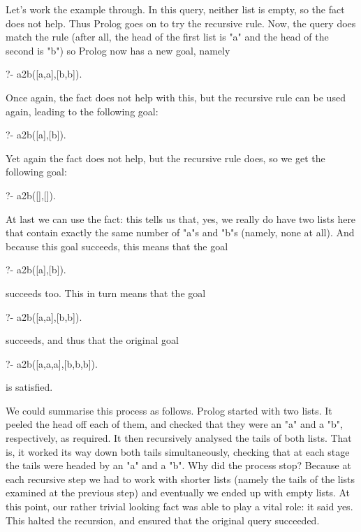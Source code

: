 Let's work the example through. In this query, neither list is empty,
so the fact does not help. Thus Prolog goes on to try the recursive
rule. Now, the query does match the rule (after all, the head of the
first list is "a" and the head of the second is "b") so
Prolog now has a new goal, namely
\begin{LPNcodedisplay}
?- a2b([a,a],[b,b]).
\end{LPNcodedisplay}
Once again, the fact does not help with this, but the recursive rule
can be used again, leading to the following goal:
\begin{LPNcodedisplay}
?- a2b([a],[b]).
\end{LPNcodedisplay}
Yet again the fact does not help, but the recursive rule does, so we
get the following goal:
\begin{LPNcodedisplay}
?- a2b([],[]).
\end{LPNcodedisplay}
At last we can use the fact: this tells us that, yes, we really do
have two lists here that contain exactly the same number of "a"s
and "b"s (namely, none at all). And because this goal succeeds,
this means that the goal
\begin{LPNcodedisplay}
?- a2b([a],[b]).
\end{LPNcodedisplay}
succeeds too. This in turn means that the goal
\begin{LPNcodedisplay}
?- a2b([a,a],[b,b]).
\end{LPNcodedisplay}
succeeds, and thus that the original goal
\begin{LPNcodedisplay}
?- a2b([a,a,a],[b,b,b]).
\end{LPNcodedisplay}
is satisfied.

We could summarise this process as follows.  Prolog started with two
lists. It peeled the head off each of them, and checked that they were
an "a" and a "b", respectively, as required. It then recursively
analysed the tails of both lists. That is, it worked its way down both
tails simultaneously, checking that at each stage the tails were
headed by an "a" and a "b".  Why did the process stop?  Because at
each recursive step we had to work with shorter lists (namely the
tails of the lists examined at the previous step) and eventually we
ended up with empty lists.  At this point, our rather trivial looking
fact was able to play a vital role: it said yes. This halted the
recursion, and ensured that the original query succeeded.


